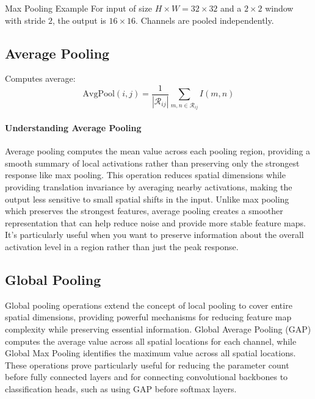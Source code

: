 \begin{examplebox}{Max Pooling Example}
For input of size $H\times W=32\times32$ and a $2\times2$ window with stride $2$, the output is $16\times16$. Channels are pooled independently.
\end{examplebox}

\subsection{Average Pooling}

Computes average:
\begin{equation}
\text{AvgPool}(i,j) = \frac{1}{|\mathcal{R}_{ij}|} \sum_{m,n \in \mathcal{R}_{ij}} I(m,n)
\end{equation}

\paragraph{Understanding Average Pooling}
Average pooling computes the mean value across each pooling region, providing a smooth summary of local activations rather than preserving only the strongest response like max pooling. This operation reduces spatial dimensions while providing translation invariance by averaging nearby activations, making the output less sensitive to small spatial shifts in the input. Unlike max pooling which preserves the strongest features, average pooling creates a smoother representation that can help reduce noise and provide more stable feature maps. It's particularly useful when you want to preserve information about the overall activation level in a region rather than just the peak response.

\subsection{Global Pooling}

Global pooling operations extend the concept of local pooling to cover entire spatial dimensions, providing powerful mechanisms for reducing feature map complexity while preserving essential information. Global Average Pooling (GAP) computes the average value across all spatial locations for each channel, while Global Max Pooling identifies the maximum value across all spatial locations. These operations prove particularly useful for reducing the parameter count before fully connected layers and for connecting convolutional backbones to classification heads, such as using GAP before softmax layers.

